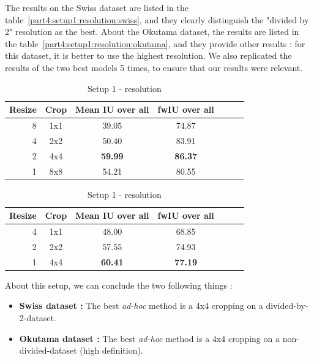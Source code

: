 The results on the Swiss dataset are listed in the table~\ref{part4:setup1:resolution:swiss}, and they clearly distinguish the "divided by 2" resolution as the best. About the Okutama dataset, the results are listed in the table~\ref{part4:setup1:resolution:okutama}, and they provide other results : for this dataset, it is better to use the highest resolution. We also replicated the results of the two best models 5 times, to ensure that our results were relevant.

\begin{table}[htbp]
  
  \begin{subtable}{\textwidth}
    \centering
    \begin{tabular}{rcccccc}
    \rowcolor{gray!50}
    \toprule
    \textbf{Resize} & \textbf{Crop} & \textbf{Mean IU over all} & \textbf{fwIU over all} \\
    \midrule
    8 & 1x1 & 39.05 & 74.87 \\
    4 & 2x2 & 50.40 & 83.91 \\
    2 & 4x4 & \textbf{59.99} & \textbf{86.37} \\
    1 & 8x8 & 54.21 & 80.55 \\
    \bottomrule
    \end{tabular}%
    \caption{Results concerning the Swiss dataset about the resolution}
    \label{part4:setup1:resolution:swiss}
  \end{subtable}
  
  \begin{subtable}{\textwidth}
    \centering
    \begin{tabular}{rcccccc}
    \rowcolor{gray!50}
    \toprule
    \textbf{Resize} & \textbf{Crop} & \textbf{Mean IU over all} & \textbf{fwIU over all} \\
    \midrule
    4 & 1x1 & 48.00 & 68.85 \\
    2 & 2x2 & 57.55 & 74.93 \\
    1 & 4x4 & \textbf{60.41} & \textbf{77.19} \\
    \bottomrule
    \end{tabular}%
    \caption{Results concerning the Okutama dataset about the resolution}
    \label{part4:setup1:resolution:okutama}
  \end{subtable}

\caption{Setup 1 - resolution}
\label{part4:setup1:resolution}
\end{table}%

About this setup, we can conclude the two following things :
\begin{itemize}
\item \textbf{Swiss dataset :} The best \textit{ad-hoc} method is a 4x4 cropping on a divided-by-2-dataset.
\item \textbf{Okutama dataset :} The best \textit{ad-hoc} method is a 4x4 cropping on a non-divided-dataset (high definition).
\end{itemize}


